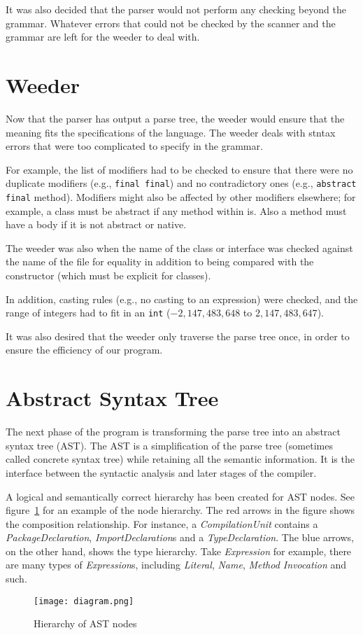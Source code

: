 It was also decided that the parser would not perform any checking beyond the grammar. Whatever errors that could not be checked by the scanner and the grammar are left for the weeder to deal with.

\section{Weeder}
\label{weeder_design}

Now that the parser has output a parse tree, the weeder would ensure that the meaning fits the specifications of the language. The weeder deals with stntax errors that were too complicated to specify in the grammar.

For example, the list of modifiers had to be checked to ensure that there were no duplicate modifiers (e.g., \verb|final final|)
  and no contradictory ones (e.g., \verb|abstract final| method).
Modifiers might also be affected by other modifiers elsewhere; for example, a class must be abstract if any method within is. Also a method must have a body if it is not abstract or native.

The weeder was also when the name of the class or interface was checked against the name of the file for equality
  in addition to being compared with the constructor (which must be explicit for classes).

In addition, casting rules (e.g., no casting to an expression) were checked,
  and the range of integers had to fit in an \verb|int| ($- 2,147,483,648$ to $2,147,483,647$).

It was also desired that the weeder only traverse the parse tree once, in order to ensure the efficiency of our program.

\section{Abstract Syntax Tree}
The next phase of the program is transforming the parse tree into an abstract syntax tree (AST). The AST is a simplification of the parse tree (sometimes called concrete syntax tree) while retaining all the semantic information. It is the interface between the syntactic analysis and later stages of the compiler. 

A logical and semantically correct hierarchy has been created for AST nodes. See figure~\ref{ast} for an example of the node hierarchy. The red arrows in the figure shows the composition relationship.  For instance, a \emph{CompilationUnit} contains a \emph{PackageDeclaration}, \emph{ImportDeclaration}s and a \emph{TypeDeclaration}. The blue arrows, on the other hand, shows the type hierarchy. Take \emph{Expression} for example, there are many types of \emph{Expression}s, including \emph{Literal}, \emph{Name}, \emph{Method Invocation} and such.
\begin{center}
\begin{figure}

\texttt{[image: diagram.png]}

\caption{Hierarchy of AST nodes}
\label{ast}
\end{figure}
\end{center}